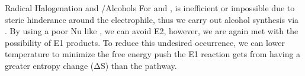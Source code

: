\documentclass[10pt]{article}
\begin{document}
\begin{core}{Radical Halogenation and \snt/\sno \rightarrow Alcohols}
    For  and , \snt is inefficient or impossible due to steric hinderance around the electrophile, thus we carry out alcohol synthesis via \sno. By using a poor Nu like , we can avoid E2, however, we are again met with the possibility of E1 products. To reduce this undesired occurrence, we can lower temperature to minimize the free energy push the E1 reaction gets from having a greater entropy change (ΔS) than the \sno pathway.


  \end{core}  
\end{document}
